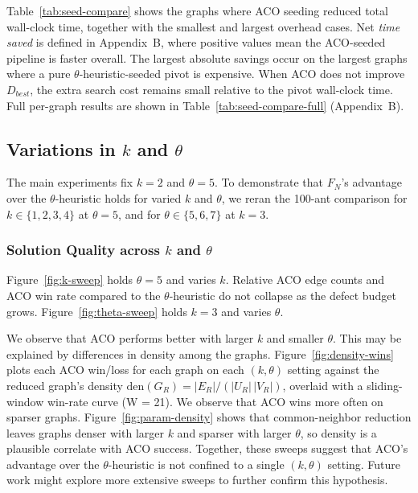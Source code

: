 \documentclass[conference]{IEEEtran}
\begin{document}
Table~\ref{tab:seed-compare} shows the graphs where ACO seeding reduced total wall-clock time, together with the smallest and largest overhead cases. Net \emph{time saved} is defined in Appendix~B, where positive values mean the ACO-seeded pipeline is faster overall. The largest absolute savings occur on the largest graphs where a pure $\theta$-heuristic-seeded pivot is expensive. When ACO does not improve $D_{best}$, the extra search cost remains small relative to the pivot wall-clock time. Full per-graph results are shown in Table~\ref{tab:seed-compare-full} (Appendix~B).




\FloatBarrier
\subsection{Variations in $k$ and $\theta$}


The main experiments fix $k = 2$ and $\theta = 5$. To demonstrate that $F_N$'s advantage over the $\theta$-heuristic holds for varied $k$ and $\theta$, we reran the 100-ant comparison for $k \in \{1, 2, 3, 4\}$ at $\theta = 5$, and for $\theta \in \{5, 6, 7\}$ at $k = 3$.


\subsubsection{Solution Quality across $k$ and $\theta$}


Figure~\ref{fig:k-sweep} holds $\theta = 5$ and varies $k$. Relative ACO edge counts and ACO win rate compared to the $\theta$-heuristic do not collapse as the defect budget grows. Figure~\ref{fig:theta-sweep} holds $k = 3$ and varies $\theta$.






We observe that ACO performs better with larger $k$ and smaller $\theta$. This may be explained by differences in density among the graphs. Figure~\ref{fig:density-wins} plots each ACO win/loss for each graph on each $(k, \theta)$ setting against the reduced graph's density $\text{den}(G_R) = |E_R|/(|U_R|\,|V_R|)$, overlaid with a sliding-window win-rate curve (W = 21). We observe that ACO wins more often on sparser graphs. Figure~\ref{fig:param-density} shows that common-neighbor reduction leaves graphs denser with larger $k$ and sparser with larger $\theta$, so density is a plausible correlate with ACO success. Together, these sweeps suggest that ACO's advantage over the $\theta$-heuristic is not confined to a single $(k, \theta)$ setting. Future work might explore more extensive sweeps to further confirm this hypothesis.
\end{document}
